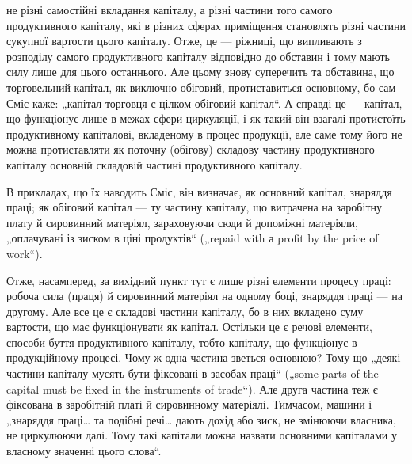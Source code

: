 \parcont{}  %
не різні самостійні вкладання капіталу, а різні частини того самого продуктивного
капіталу, які в різних сферах приміщення становлять різні
частини сукупної вартости цього капіталу. Отже, це — ріжниці, що випливають
з розподілу самого продуктивного капіталу відповідно до
обставин і тому мають силу лише для цього останнього. Але цьому знову
суперечить та обставина, що торговельний капітал, як виключно обіговий,
протиставиться основному, бо сам Сміс каже: „капітал торговця є
цілком обіговий капітал“. А справді це — капітал, що функціонує лише
в межах сфери циркуляції, і як такий він взагалі протистоїть продуктивному
капіталові, вкладеному в процес продукції, але саме тому його не
можна протиставляти як поточну (обігову) складову частину продуктивного
капіталу основній складовій частині продуктивного капіталу.

В прикладах, що їх наводить Сміс, він визначає, як основний капітал,
знаряддя праці; як обіговий капітал — ту частину капіталу, що витрачена
на заробітну плату й сировинний матеріял, зараховуючи сюди й допоміжні
матеріяли, „оплачувані із зиском в ціні продуктів“ („repaid with а
profit by the price of work“).

Отже, насамперед, за вихідний пункт тут є лише різні елементи процесу
праці: робоча сила (праця) й сировинний матеріял на одному боці,
знаряддя праці — на другому. Але все це є складові частини капіталу, бо
в них вкладено суму вартости, що має функціонувати як капітал. Остільки
це є речові елементи, способи буття продуктивного капіталу, тобто
капіталу, що функціонує в продукційному процесі. Чому ж одна частина
зветься основною? Тому що „деякі частини капіталу мусять бути фіксовані
в засобах праці“ („some parts of the capital must be fixed in the
instruments of trade“). Але друга частина теж є фіксована в заробітній
платі й сировинному матеріялі. Тимчасом, машини і „знаряддя праці\dots{} та
подібні речі\dots{} дають дохід або зиск, не змінюючи власника, не циркулюючи
далі. Тому такі капітали можна назвати основними капіталами у
власному значенні цього слова“.

